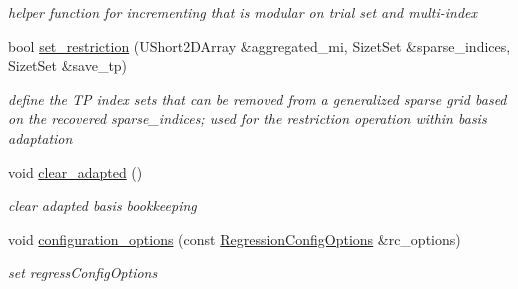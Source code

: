 \begin{DoxyCompactItemize}
\begin{DoxyCompactList}\small\item\em helper function for incrementing that is modular on trial set and multi-\/index \end{DoxyCompactList}\item 
bool \hyperlink{classPecos_1_1SharedRegressOrthogPolyApproxData_a64eba58daf7b9c3366053d96b4101e3c}{set\+\_\+restriction} (U\+Short2\+D\+Array \&aggregated\+\_\+mi, Sizet\+Set \&sparse\+\_\+indices, Sizet\+Set \&save\+\_\+tp)\label{classPecos_1_1SharedRegressOrthogPolyApproxData_a64eba58daf7b9c3366053d96b4101e3c}

\begin{DoxyCompactList}\small\item\em define the TP index sets that can be removed from a generalized sparse grid based on the recovered sparse\+\_\+indices; used for the restriction operation within basis adaptation \end{DoxyCompactList}\item 
void \hyperlink{classPecos_1_1SharedRegressOrthogPolyApproxData_a52ad6e9a0c72b622483a4753d0a9cc14}{clear\+\_\+adapted} ()\label{classPecos_1_1SharedRegressOrthogPolyApproxData_a52ad6e9a0c72b622483a4753d0a9cc14}

\begin{DoxyCompactList}\small\item\em clear adapted basis bookkeeping \end{DoxyCompactList}\item 
void \hyperlink{classPecos_1_1SharedRegressOrthogPolyApproxData_a3f8c171f5c53cdfa6cacf367934de117}{configuration\+\_\+options} (const \hyperlink{classPecos_1_1RegressionConfigOptions}{Regression\+Config\+Options} \&rc\+\_\+options)\label{classPecos_1_1SharedRegressOrthogPolyApproxData_a3f8c171f5c53cdfa6cacf367934de117}

\begin{DoxyCompactList}\small\item\em set regress\+Config\+Options \end{DoxyCompactList}\end{DoxyCompactItemize}
